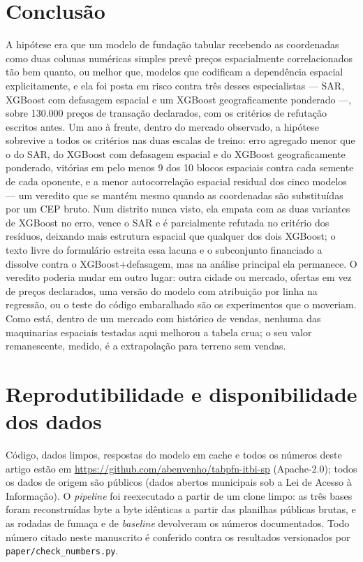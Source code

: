 \documentclass[11pt,a4paper]{article}
\begin{document}
\section{Conclusão}
\label{sec:conclusion}

A hipótese era que um modelo de fundação tabular recebendo as coordenadas como duas colunas
numéricas simples prevê preços espacialmente correlacionados tão bem quanto, ou melhor que,
modelos que codificam a dependência espacial explicitamente, e ela foi posta em risco contra
três desses especialistas --- SAR, XGBoost com defasagem espacial e um XGBoost geograficamente
ponderado ---, sobre 130.000 preços de transação declarados, com os critérios de refutação
escritos antes. Um ano à frente, dentro do mercado observado, a hipótese sobrevive a
todos os critérios nas duas escalas de treino: erro agregado menor que o do SAR, do XGBoost com
defasagem espacial e do XGBoost geograficamente ponderado, vitórias em pelo menos 9 dos 10
blocos espaciais contra cada semente de cada oponente, e a menor autocorrelação espacial
residual dos cinco modelos --- um veredito que se mantém mesmo quando as coordenadas são
substituídas por um CEP bruto. Num distrito nunca visto, ela empata com as duas variantes de
XGBoost no erro, vence o SAR e é parcialmente refutada no critério dos resíduos, deixando mais
estrutura espacial que qualquer dos dois XGBoost; o texto livre do formulário estreita essa
lacuna e o subconjunto financiado a dissolve contra o XGBoost+defasagem, mas na análise
principal ela permanece. O veredito poderia mudar em outro lugar: outra cidade ou mercado,
ofertas em vez de preços declarados, uma versão do modelo com atribuição por linha na
regressão, ou o teste do código embaralhado são os experimentos que o moveriam. Como está, dentro de um
mercado com histórico de vendas, nenhuma das maquinarias espaciais testadas aqui melhorou a
tabela crua; o seu valor remanescente, medido, é a extrapolação para terreno sem vendas.

\section*{Reprodutibilidade e disponibilidade dos dados}
Código, dados limpos, respostas do modelo em cache e todos os números deste artigo estão em
\url{https://github.com/abenvenho/tabpfn-itbi-sp} (Apache-2.0); todos os dados de origem são
públicos (dados abertos municipais sob a Lei de Acesso à Informação). O \emph{pipeline} foi
reexecutado a partir de um clone limpo: as três bases foram reconstruídas byte a byte idênticas
a partir das planilhas públicas brutas, e as rodadas de fumaça e de \emph{baseline} devolveram
os números documentados. Todo número citado neste manuscrito é conferido contra os resultados
versionados por \texttt{paper/check\_numbers.py}.
\end{document}
